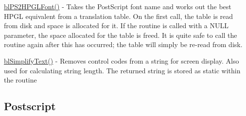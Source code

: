 \begin{DoxyItemize}
\item \hyperlink{plotting_8c_a72e3d7f312397d3991d11c85f9c31187}{bl\-P\-S2\-H\-P\-G\-L\-Font()} -\/ Takes the Post\-Script font name and works out the best H\-P\-G\-L equivalent from a translation table. On the first call, the table is read from disk and space is allocated for it. If the routine is called with a N\-U\-L\-L parameter, the space allocated for the table is freed. It is quite safe to call the routine again after this has occurred; the table will simply be re-\/read from disk.
\item \hyperlink{plotting_8c_afc7b2728d2874e4133786a77c5175fef}{bl\-Simplify\-Text()} -\/ Removes control codes from a string for screen display. Also used for calculating string length. The returned string is stored as static within the routine
\end{DoxyItemize}

\subsection*{Postscript }


